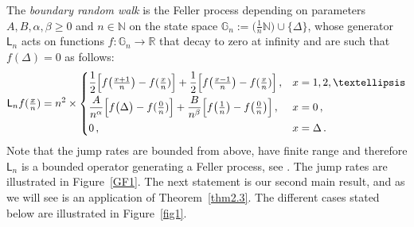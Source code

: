 \documentclass[12pt,a4paper]{article}
\theoremstyle{plain}
\theoremstyle{remark}
\newcommand{\msf}[1]{{\mathsf #1}}
\newcommand{\bb}[1]{{\mathbb #1}}
\newcommand{\pfrac}[2]{\genfrac{}{}{}{1}{#1}{#2}}
\begin{document}
	The \textit{boundary random walk} is the Feller process depending on parameters $A, B, \alpha,\beta\geq 0$ and $n\in \bb N$  on the state space $\bb{G}_n := \big(\frac{1}{n}\bb{N}\big) \cup \{\Delta\}$, whose  generator $\mathsf{L}_n$  acts on functions $f : \mathbb{G}_n \to \bb{R}$ that decay to zero at infinity and are such that $f(\Delta)=0$ as follows:
	\begin{equation}\label{RWgm}
		\msf{L}_nf(\pfrac{x}{n})=n^2\times
		\begin{cases}
			\dfrac{1}{2}\Big[f\big(\pfrac{x+1}{n}\big)-f(\pfrac{x}{n})\Big]+\dfrac{1}{2}\Big[f\big(\pfrac{x-1}{n}\big)-f(\pfrac{x}{n})\Big]\,,& x=1,2, \ldots  \vspace{3pt}\\
			\dfrac{A}{n^\alpha}\Big[f\big(\Delta\big)-f(\pfrac{0}{n})\Big]+\dfrac{B}{n^\beta}\Big[f\big(\pfrac{1}{n}\big)-f\big(\pfrac{0}{n}\big)\Big]\,,&  x= 0\,,\vspace{3pt}\\
			0\,,&x =\Delta\,.
		\end{cases}
	\end{equation}
	Note that the jump  rates are bounded from above, have finite range and therefore $\msf L_n$ is a bounded operator generating a Feller process, see \cite[Theorem~9]{Reuter}.
	The jump rates are illustrated in Figure~\ref{GF1}.  The next statement is our second main result, and as we will see is an application of  Theorem~\ref{thm2.3}. The different cases stated below are illustrated in Figure~\ref{fig1}.
\end{document}
